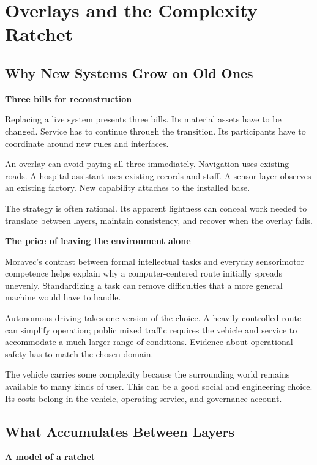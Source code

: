 \documentclass[11pt,openany]{book}
\newcommand{\subhead}[1]{\par\medskip\noindent\textbf{#1}\par\nobreak\smallskip}
\begin{document}
\section{Overlays and the Complexity Ratchet}

\subsection{Why New Systems Grow on Old Ones}

\subhead{Three bills for reconstruction}

Replacing a live system presents three bills. Its material assets have to be changed. Service has to continue through the transition. Its participants have to coordinate around new rules and interfaces.

An overlay can avoid paying all three immediately. Navigation uses existing roads. A hospital assistant uses existing records and staff. A sensor layer observes an existing factory. New capability attaches to the installed base.

The strategy is often rational. Its apparent lightness can conceal work needed to translate between layers, maintain consistency, and recover when the overlay fails.

\subhead{The price of leaving the environment alone}

Moravec's contrast between formal intellectual tasks and everyday sensorimotor competence helps explain why a computer-centered route initially spreads unevenly.\cite{moravec1988} Standardizing a task can remove difficulties that a more general machine would have to handle.

Autonomous driving takes one version of the choice. A heavily controlled route can simplify operation; public mixed traffic requires the vehicle and service to accommodate a much larger range of conditions. Evidence about operational safety has to match the chosen domain.\cite{kalra2016}

The vehicle carries some complexity because the surrounding world remains available to many kinds of user. This can be a good social and engineering choice. Its costs belong in the vehicle, operating service, and governance account.

\subsection{What Accumulates Between Layers}

\subhead{A model of a ratchet}
\end{document}

